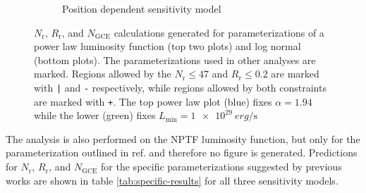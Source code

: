\documentclass[a4paper,11pt]{article}
\begin{document}
\begin{figure}
\begin{subfigure}[b]{0.49\textwidth}
        \caption{Position dependent sensitivity model}
        \label{fig:position-dependent}
    \end{subfigure}
    \caption{$N_\text{r}$, $R_\text{r}$, and $N_\text{GCE}$ calculations generated for parameterizations of a power law luminosity function (top two plots) and log normal (bottom plots). The parameterizations used in other analyses are marked. Regions allowed by the $N_\text{r} \leq 47$ and $R_\text{r} \leq 0.2$ are marked with \texttt{|} and \texttt{-} respectively, while regions allowed by both constraints are marked with \texttt{+}. The top power law plot (blue) fixes $\alpha=1.94$ while the lower (green) fixes $L_\text{min}=\SI{1e29}{erg\per\second}$ }
\end{figure}

The analysis is also performed on the NPTF luminosity function, but only for the parameterization outlined in ref. \cite{Lee:2015fea} and therefore no figure is generated. Predictions for $N_\text{r}$, $R_\text{r}$, and $N_\text{GCE}$ for the specific parameterizations suggested by previous works are shown in table \ref{tab:specific-results} for all three sensitivity models.
\end{document}
